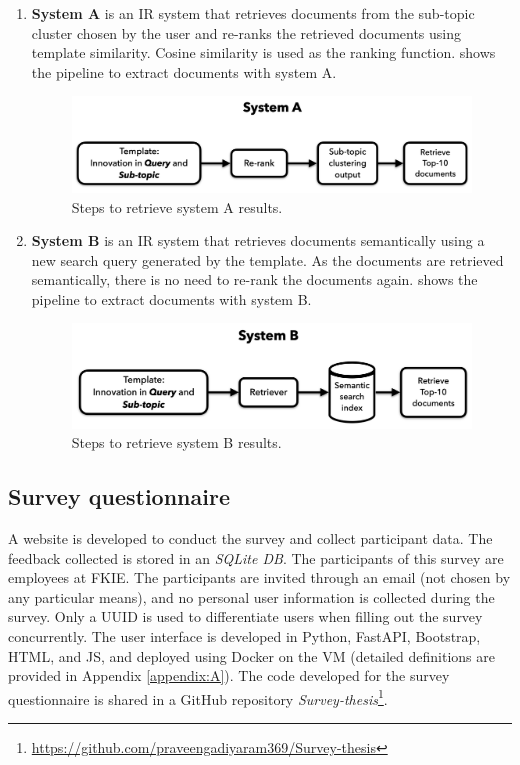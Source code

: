 \begin{enumerate}
	\item 	\textbf{System A} is an \ac{IR} system that retrieves documents from the sub-topic cluster chosen by the user and re-ranks the retrieved documents using template similarity. Cosine similarity is used as the ranking function.  shows the pipeline to extract documents with system A.
	
	
\begin{figure}[h]
	\centering
	\includegraphics[width=.9\textwidth]{images/thesis_images/systemA.png}
		\caption{Steps to retrieve system A results. \label{fig:systemA}}
\end{figure}
	
	\item 	\textbf{System B} is an \ac{IR} system that retrieves documents semantically using a new search query generated by the template. As the documents are retrieved semantically, there is no need to re-rank the documents again.  shows the pipeline to extract documents with system B.
	
	
	\begin{figure}[h]
		\centering
		\includegraphics[width=.9\textwidth]{images/thesis_images/systemB.png}
		\caption{Steps to retrieve system B results. \label{fig:systemB}}
	\end{figure}
	
\end{enumerate}

\subsection{Survey questionnaire}

A website is developed to conduct the survey and collect participant data. The feedback collected is stored in an \emph{SQLite DB}. The participants of this survey are employees at \ac{FKIE}. The participants are invited through an email (not chosen by any particular means), and no personal user information is collected during the survey. Only a \ac{UUID} is used to differentiate users when filling out the survey concurrently. The user interface is developed in Python, FastAPI, Bootstrap, \ac{HTML}, and \ac{JS}, and deployed using Docker on the \ac{VM} (detailed definitions are provided in Appendix \ref{appendix:A}). The code developed for the survey questionnaire is shared in a GitHub repository \emph{Survey-thesis}\footnote{\url{https://github.com/praveengadiyaram369/Survey-thesis}}.


